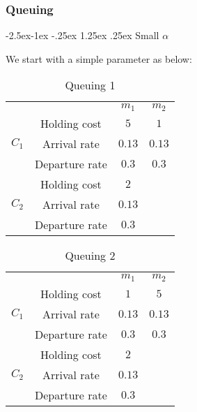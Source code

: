 \documentclass[
  a4paper, xcolor = usenames,dvipsnames]{article}
\makeatletter
\renewcommand\paragraph{\@startsection{paragraph}{4}{\z@}%
  {-2.5ex\@plus -1ex \@minus -.25ex}%
  {1.25ex \@plus .25ex}%
  {\normalfont\normalsize\bfseries}}
\theoremstyle{definition}
\theoremstyle{definition}
\theoremstyle{definition}
\theoremstyle{definition}
\theoremstyle{remark}
\makeatother
\begin{document}
\hypertarget{queuing-1}{%
\subsubsection{Queuing}\label{queuing-1}}

\hypertarget{small-alpha}{%
\paragraph{\texorpdfstring{Small \(\alpha\)}{Small \textbackslash alpha}}\label{small-alpha}}

We start with a simple parameter as below:

\begin{table}[!htbp]
\caption{Queuing 1}
\begin{center}
\begin{tabular}{c c c c}
    \hline
    \multicolumn{2}{c}{} & $m_{1}$ & $m_{2}$ \\
    \cline{2-4}
    \multirow{3}{*}{$C_{1}$} & Holding cost & $5$ & $1$ \\
    & Arrival rate & $0.13$ & $0.13$ \\
    & Departure rate & $0.3$ & $0.3$ \\
    \cline{2-4}
    \multirow{3}{*}{$C_{2}$} & Holding cost & $2$ & \\
    & Arrival rate & $0.13$ & \\
    & Departure rate & $0.3$ & \\    
    \hline
\end{tabular}
\label{tab:queuing-1}
\end{center}
\end{table}

\begin{table}[!htbp]
\caption{Queuing 2}
\begin{center}
\begin{tabular}{c c c c}
    \hline
    \multicolumn{2}{c}{} & $m_{1}$ & $m_{2}$ \\
    \cline{2-4}
    \multirow{3}{*}{$C_{1}$} & Holding cost & $1$ & $5$ \\
    & Arrival rate & $0.13$ & $0.13$ \\
    & Departure rate & $0.3$ & $0.3$ \\
    \cline{2-4}
    \multirow{3}{*}{$C_{2}$} & Holding cost & $2$ & \\
    & Arrival rate & $0.13$ & \\
    & Departure rate & $0.3$ & \\    
    \hline
\end{tabular}
\label{tab:queuing-2}
\end{center}
\end{table}
\end{document}
